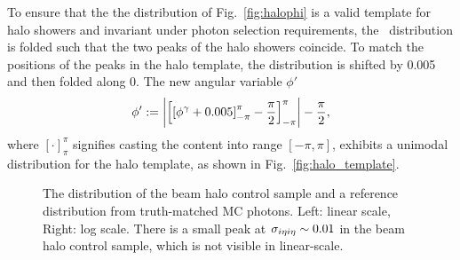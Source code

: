 To ensure that the the distribution of Fig.~\ref{fig:halophi} is a valid template for halo showers and invariant under photon selection requirements, the \phig\ distribution is folded such that the two peaks of the halo showers coincide.
To match the positions of the peaks in the halo template, the distribution is shifted by 0.005 and then folded along 0. 
The new angular variable $\phi'$
\begin{equation}
  \phi' := \left|\left[\left[\phi^{\gamma} + 0.005\right]_{-\pi}^{\pi} - \frac{\pi}{2}\right]_{-\pi}^{\pi}\right| - \frac{\pi}{2},
  \label{eqn:phi}
\end{equation}
where $[\cdot]_{\pi}^{\pi}$ signifies casting the content into range $[-\pi,\pi]$,
exhibits a unimodal distribution for the halo template, as shown in Fig.~\ref{fig:halo_template}.

\begin{figure}[htbp]
  \centering
  \caption{
    The \sieie distribution of the beam halo control sample and a reference distribution from truth-matched MC photons. 
    Left: linear scale, Right: log scale. 
    There is a small peak at $\sigma_{i\eta i\eta} \sim 0.01$ in the beam halo control sample, which is not visible in linear-scale.
  }
  \label{fig:halo_sieie}
\end{figure}

